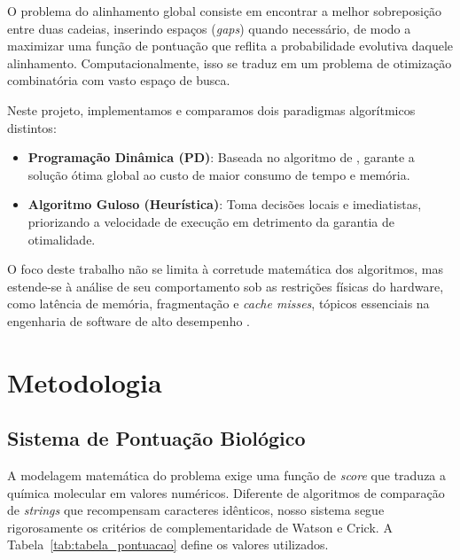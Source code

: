 \documentclass[12pt]{article}
\begin{document}
O problema do alinhamento global consiste em encontrar a melhor sobreposição entre duas cadeias, inserindo espaços (\textit{gaps}) quando necessário, de modo a maximizar uma função de pontuação que reflita a probabilidade evolutiva daquele alinhamento. Computacionalmente, isso se traduz em um problema de otimização combinatória com vasto espaço de busca.

Neste projeto, implementamos e comparamos dois paradigmas algorítmicos distintos:
\begin{itemize}
    \item \textbf{Programação Dinâmica (PD)}: Baseada no algoritmo de \cite{needleman:70}, garante a solução ótima global ao custo de maior consumo de tempo e memória.
    \item \textbf{Algoritmo Guloso (Heurística)}: Toma decisões locais e imediatistas, priorizando a velocidade de execução em detrimento da garantia de otimalidade.
\end{itemize}

O foco deste trabalho não se limita à corretude matemática dos algoritmos, mas estende-se à análise de seu comportamento sob as restrições físicas do hardware, como latência de memória, fragmentação e \textit{cache misses}, tópicos essenciais na engenharia de software de alto desempenho \cite{cormen:2012,ziviani:2007}.

\section{Metodologia}
\label{sec:metodologia}

\subsection{Sistema de Pontuação Biológico}
\label{subsec:pontuacao}

A modelagem matemática do problema exige uma função de \textit{score} que traduza a química molecular em valores numéricos. Diferente de algoritmos de comparação de \textit{strings} que recompensam caracteres idênticos, nosso sistema segue rigorosamente os critérios de complementaridade de Watson e Crick. A Tabela~\ref{tab:tabela_pontuacao} define os valores utilizados.
\end{document}

